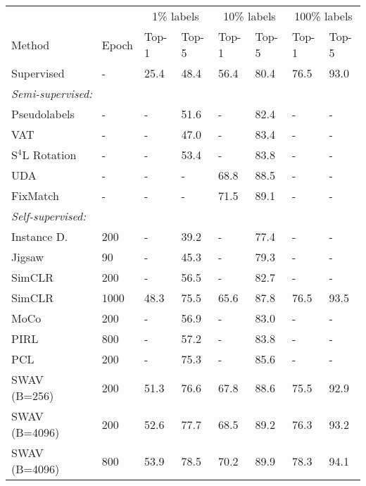 \documentclass[10pt,twocolumn,letterpaper]{article}
\begin{document}
\begin{table}[t!]
\scriptsize
\centering
\begin{tabular}{@{}lp{18pt}|p{18pt}@{}p{18pt}@{}|p{18pt}@{}p{18pt}|p{18pt}@{}p{18pt}}\toprule
&   & \multicolumn{2}{c|}{1\% labels} & \multicolumn{2}{c|}{10\% labels} & \multicolumn{2}{c}{100\% labels} \\
 Method   & Epoch & Top-1 &  Top-5  & Top-1 &  Top-5 & Top-1 &  Top-5  \\ 
\hline
 Supervised~~ &  -  &  25.4 & 48.4 & 56.4 & 80.4 & 76.5 & 93.0\\
\hline
\multicolumn{6}{l}{{\hspace{-3mm} \em Semi-supervised: }}  \\
\hline
Pseudolabels~\cite{zhai2019s4l} &  - & - &  51.6 & - &82.4 & - & -\\
VAT ~\cite{miyato2018virtual,zhai2019s4l} & -  & - & 47.0 & - & 83.4 & - & -\\
S$^4$L Rotation~\cite{zhai2019s4l} & - & - &  53.4 & - & 83.8 & - & -\\
UDA~\cite{xie2019unsupervised}  & - & - & - & 68.8 & 88.5 & - & -\\
FixMatch & - & - & - & 71.5  & 89.1 & - & -\\
   \hline
\multicolumn{6}{l}{{\hspace{-3mm} \em Self-supervised: }}  \\
\hline
Instance D.~\cite{wu2018unsupervised} & 200 &  - &   39.2 & - & 77.4& - & - \\
Jigsaw~\cite{noroozi2016unsupervised} & 90 & - & 45.3 & - &  79.3 & - & -\\
SimCLR~\cite{chen2020simple} & 200 & - & 56.5 & - & 82.7 & - & -\\
SimCLR~\cite{chen2020simple} & 1000 & 48.3 & 75.5 & 65.6  & 87.8 & 76.5 & 93.5\\
MoCo~\cite{he2020momentum} & 200 & - & 56.9 & - & 83.0 & - & -\\        
PIRL~\cite{misra2020self} & 800 & - & 57.2 & - & 83.8 & - & -\\
PCL~\cite{li2020prototypical} & 200 & - & 75.3 & - & 85.6 & - & -\\
SWAV \!(B=256)\!~\cite{caron2020unsupervised} & 200 & 51.3 & 76.6 & 67.8 & 88.6  & 75.5 & 92.9 \\
SWAV \!(B=4096)\!~\cite{caron2020unsupervised} & 200 & 52.6 & 77.7 & 68.5 & 89.2  & 76.3 & 93.2 \\
SWAV \!(B=4096)\!~\cite{caron2020unsupervised} & 800 & 53.9 & 78.5 & 70.2 & 89.9 & 78.3 & 94.1\\ 

\end{tabular}
\end{table}
\end{document}
